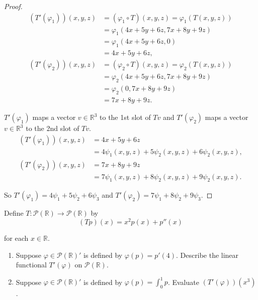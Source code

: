 \begin{proof}
    \begin{align*}
        (T'(\varphi_{1}))(x, y, z) & = (\varphi_{1}\circ T)(x, y, z) = \varphi_{1}(T(x, y, z)) \\
                                   & = \varphi_{1}(4x + 5y + 6z, 7x + 8y + 9z)                 \\
                                   & = \varphi_{1}(4x + 5y + 6z, 0)                            \\
                                   & = 4x + 5y + 6z,                                           \\
        (T'(\varphi_{2}))(x, y, z) & = (\varphi_{2}\circ T)(x, y, z) = \varphi_{2}(T(x, y, z)) \\
                                   & = \varphi_{2}(4x + 5y + 6z, 7x + 8y + 9z)                 \\
                                   & = \varphi_{2}(0, 7x + 8y + 9z)                            \\
                                   & = 7x + 8y + 9z.
    \end{align*}

    $T'(\varphi_{1})$ maps a vector $v\in \mathbb{R}^{3}$ to the 1st slot of $Tv$ and $T'(\varphi_{2})$ maps a vector $v\in \mathbb{R}^{3}$ to the 2nd slot of $Tv$.
    \begin{align*}
        (T'(\varphi_{1}))(x, y, z) & = 4x + 5y + 6z                                                  \\
                                   & = 4\psi_{1}(x, y, z) + 5\psi_{2}(x, y, z) + 6\psi_{2}(x, y, z), \\
        (T'(\varphi_{2}))(x, y, z) & = 7x + 8y + 9z                                                  \\
                                   & = 7\psi_{1}(x, y, z) + 8\psi_{2}(x, y, z) + 9\psi_{2}(x, y, z).
    \end{align*}

    So $T'(\varphi_{1}) = 4\psi_{1} + 5\psi_{2} + 6\psi_{3}$ and $T'(\varphi_{2}) = 7\psi_{1} + 8\psi_{2} + 9\psi_{3}$.
\end{proof}
\newpage

\begin{exercise}
    Define $T: \mathcal{P}(\mathbb{R})\to \mathcal{P}(\mathbb{R})$ by
    \[
        (Tp)(x) = x^{2}p(x) + p''(x)
    \]

    for each $x\in \mathbb{R}$.
    \begin{enumerate}[label={(\alph*)}]
        \item Suppose $\varphi\in\mathcal{P}(\mathbb{R})'$ is defined by $\varphi(p) = p'(4)$. Describe the linear functional $T'(\varphi)$ on $\mathcal{P}(\mathbb{R})$.
        \item Suppose $\varphi\in\mathcal{P}(\mathbb{R})'$ is defined by $\varphi(p) = \int^{1}_{0}p$. Evaluate $(T'(\varphi))(x^{3})$.
    \end{enumerate}
\end{exercise}

